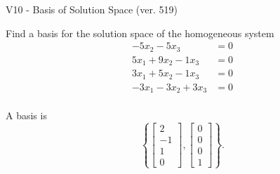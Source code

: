 \begin{exercise}
  \begin{exerciseTitle}V10 - Basis of Solution Space (ver. 519)\end{exerciseTitle}
  \begin{exerciseStatement}
    Find a basis for the solution space of the homogeneous system 
\begin{align*}
 -5 x_ 2 -5 x_ 3 &= 0  \\ 
  5 x_ 1 + 9 x_ 2 -1 x_ 3 &= 0  \\ 
  3 x_ 1 + 5 x_ 2 -1 x_ 3 &= 0  \\ 
  -3 x_ 1 -3 x_ 2 + 3 x_ 3 &= 0  \\ 
 \end{align*}


 
  \end{exerciseStatement}

  \begin{exerciseAnswer}
   A basis is   
\[\left\{\left[\begin{array}{c}
2 \\
-1 \\
1 \\
0
\end{array}\right] , \left[\begin{array}{c}
0 \\
0 \\
0 \\
1
\end{array}\right]\right\}.\]

  


  \end{exerciseAnswer}
\end{exercise}
